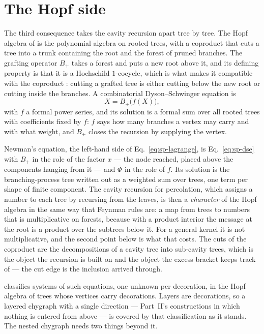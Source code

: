 \section{The Hopf side}
\label{sec:sp-hopf}

The third consequence takes the cavity recursion apart tree by tree. The
Hopf algebra of \citet{connes1998} is the polynomial algebra on rooted
trees, with a coproduct that cuts a tree into a trunk containing the root
and the forest of pruned branches. The grafting operator $B_{+}$ takes a
forest and puts a new root above it, and its defining property is that it is
a Hochschild $1$-cocycle, which is what makes it compatible with the
coproduct \citep{bergbauer2006}: cutting a grafted tree is either cutting
below the new root or cutting inside the branches. A combinatorial
Dyson--Schwinger equation is
\begin{equation}
  X=B_{+}\bigl(f(X)\bigr),
  \label{eq:sp-dse}
\end{equation}
with $f$ a formal power series, and its solution is a formal sum over all
rooted trees with coefficients fixed by $f$: $f$ says how many branches a
vertex may carry and with what weight, and $B_{+}$ closes the recursion by
supplying the vertex.

Newman's equation, the left-hand side of Eq.~\eqref{eq:sp-lagrange}, is
Eq.~\eqref{eq:sp-dse} with $B_{+}$ in the role of the factor $x$ --- the node
reached, placed above the components hanging from it --- and $\bar\Phi$ in
the role of $f$. Its solution is the branching-process tree written out as a
weighted sum over trees, one term per shape of finite component. The cavity
recursion for percolation, which assigns a number to each tree by recursing
from the leaves, is then a \emph{character} of the Hopf algebra in the same
way that Feynman rules are: a map from trees to numbers that is
multiplicative on forests, because with a product interior the message at
the root is a product over the subtrees below it. For a general kernel it
is not multiplicative, and the second point below is what that costs. The
cuts of the coproduct are the decompositions of a
cavity tree into sub-cavity trees, which is the object the recursion is
built on and the object the excess bracket keeps track of --- the cut edge
is the inclusion arrived through.

\citet{foissy2010} classifies systems of such equations, one unknown per
decoration, in the Hopf algebra of trees whose vertices carry decorations.
Layers are decorations, so a layered chygraph with a single direction ---
Part~II's constructions in which nothing is entered from above --- is
covered by that classification as it stands. The nested chygraph needs two
things beyond it.

